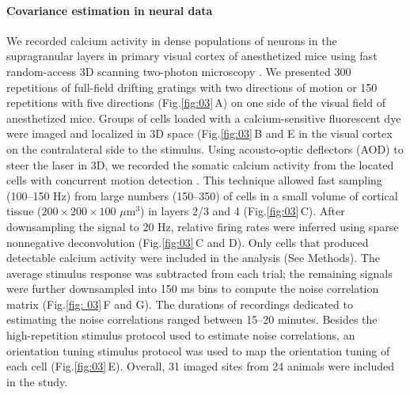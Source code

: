 \documentclass[10pt]{article}
\newcommand{\figref}[2]{Fig.\;\ref{fig:#1}\,#2}
\begin{document}
\paragraph{Covariance estimation in neural data}
We recorded calcium activity in dense populations of neurons in the supragranular layers in primary visual cortex of anesthetized mice using fast random-access 3D scanning two-photon microscopy \cite{Reddy:2005, Katona:2012, Cotton:2013}. We presented 300 repetitions of full-field drifting gratings with two directions of motion or 150 repetitions with five directions (\figref{03}{A}) on one side of the visual field of anesthetized mice. Groups of cells loaded with a calcium-sensitive fluorescent dye were imaged and localized in 3D space (\figref{03}{B and E} in the visual cortex on the contralateral side to the stimulus. Using acousto-optic deflectors (AOD) to steer the laser in 3D,  we recorded the somatic calcium activity from the located cells with concurrent motion detection \cite{Cotton:2013}. This technique allowed fast sampling (100--150 Hz) from large numbers (150--350) of cells in a small volume of cortical tissue ($200\times200\times100$ $\mu$m$^3$) in layers 2/3 and 4 (\figref{03}{C}). After downsampling the signal to 20 Hz, relative firing rates were inferred using sparse nonnegative deconvolution \cite{Vogelstein:2010} (\figref{03}{C and D}). Only cells that produced detectable calcium activity were included in the analysis (See Methods). The average stimulus response was subtracted from each trial; the remaining signals were further downsampled into 150 ms bins to compute the noise correlation matrix (\figref{ 03}{F and G}). The durations of recordings dedicated to estimating the noise correlations ranged between 15--20 minutes.  Besides the high-repetition stimulus protocol used to estimate noise correlations, an orientation tuning stimulus protocol was used to map the orientation tuning of each cell (\figref{03}{E}). Overall, 31 imaged sites from 24 animals were included in the study.
\end{document}
